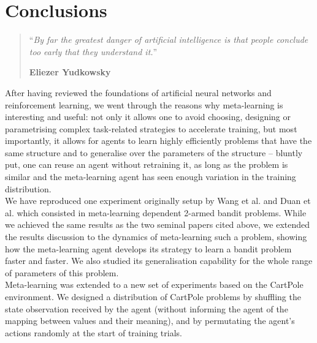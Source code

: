 \chapter{Conclusions}
\begin{quotation}
\noindent ``\emph{By far the greatest danger of artificial intelligence
	is that people conclude too early that they understand it.}''
\begin{flushright}\textbf{Eliezer Yudkowsky}\end{flushright}
\end{quotation}
\vspace*{0.5cm}

After having reviewed the foundations of artificial neural networks and
reinforcement learning, we went through the reasons why meta-learning is
interesting and useful: not only it allows one to avoid choosing, designing
or parametrising complex task-related strategies to accelerate training, but
most importantly, it allows for agents to learn highly efficiently problems
that have the same structure and to generalise over the parameters of the 
structure -- bluntly put, one can reuse an agent without retraining it, as long
as the problem is similar and the meta-learning agent has seen enough
variation in the training distribution.\\

We have reproduced one experiment originally setup by Wang et al. 
\cite{learningtorl} and Duan et al. \cite{fastrlviaslowrl} which consisted
in meta-learning dependent 2-armed bandit problems. While we achieved the
same results as the two seminal papers cited above, we extended the results
discussion to the dynamics of meta-learning such a problem, showing how
the meta-learning agent develops its strategy to learn a bandit problem faster
and faster. We also studied its generalisation capability for the whole
range of parameters of this problem.\\

Meta-learning was extended to a new set of experiments based on the CartPole
environment. We designed a distribution of CartPole problems by shuffling
the state observation received by the agent (without informing the agent
of the mapping between values and their meaning), and by permutating 
the agent's actions randomly at the start of training trials.\\

